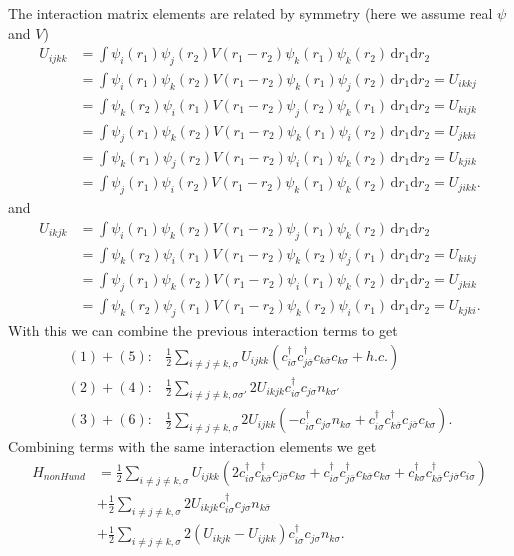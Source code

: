 \documentclass[12pt,a4paper]{scrartcl}
\numberwithin{equation}{section}
\begin{document}
The interaction matrix elements are related by symmetry (here we assume real $\psi$ and $V$)
\begin{align}
 U_{ijkk}
 &= \int \psi_i(r_1) \psi_j(r_2) V(r_1-r_2) \psi_k(r_1) \psi_k(r_2) \, \mathrm{d}r_1\mathrm{d}r_2 \\
 &= \int \psi_i(r_1) \psi_k(r_2) V(r_1-r_2) \psi_k(r_1) \psi_j(r_2) \, \mathrm{d}r_1\mathrm{d}r_2 = U_{ikkj} \\
 &= \int \psi_k(r_2) \psi_i(r_1) V(r_1-r_2) \psi_j(r_2) \psi_k(r_1) \, \mathrm{d}r_1\mathrm{d}r_2 = U_{kijk} \\
 &= \int \psi_j(r_1) \psi_k(r_2) V(r_1-r_2) \psi_k(r_1) \psi_i(r_2) \, \mathrm{d}r_1\mathrm{d}r_2 = U_{jkki} \\
 &= \int \psi_k(r_1) \psi_j(r_2) V(r_1-r_2) \psi_i(r_1) \psi_k(r_2) \, \mathrm{d}r_1\mathrm{d}r_2 = U_{kjik} \\
 &= \int \psi_j(r_1) \psi_i(r_2) V(r_1-r_2) \psi_k(r_1) \psi_k(r_2) \, \mathrm{d}r_1\mathrm{d}r_2 = U_{jikk} .
\end{align}
and 
\begin{align}
 U_{ikjk}
 &= \int \psi_i(r_1) \psi_k(r_2) V(r_1-r_2) \psi_j(r_1) \psi_k(r_2) \, \mathrm{d}r_1\mathrm{d}r_2 \\
 &= \int \psi_k(r_2) \psi_i(r_1) V(r_1-r_2) \psi_k(r_2) \psi_j(r_1) \, \mathrm{d}r_1\mathrm{d}r_2 = U_{kikj} \\
 &= \int \psi_j(r_1) \psi_k(r_2) V(r_1-r_2) \psi_i(r_1) \psi_k(r_2) \, \mathrm{d}r_1\mathrm{d}r_2 = U_{jkik} \\
 &= \int \psi_k(r_2) \psi_j(r_1) V(r_1-r_2) \psi_k(r_2) \psi_i(r_1) \, \mathrm{d}r_1\mathrm{d}r_2 = U_{kjki} .
\end{align}
With this we can combine the previous interaction terms to get
\begin{align}
 (1)+(5):& \frac{1}{2}\sum_{i\neq j\neq k,\sigma} U_{ijkk} ( c^{\dagger}_{i\sigma} c^{\dagger}_{j\bar{\sigma}} c_{k\bar{\sigma}} c_{k\sigma} + h.c. ) \\
%
 (2)+(4):&  \frac{1}{2}\sum_{i\neq j\neq k,\sigma\sigma'} 2 U_{ikjk} c^{\dagger}_{i\sigma} c_{j\sigma}  n_{k\sigma'} \\
%
 (3)+(6):& \frac{1}{2}\sum_{i\neq j\neq k,\sigma} 2 U_{ijkk} ( - c^{\dagger}_{i\sigma} c_{j\sigma} n_{k\sigma}
                            +c^{\dagger}_{i\sigma} c^{\dagger}_{k\bar{\sigma}} c_{j\bar{\sigma}} c_{k\sigma} ) .
\end{align}
Combining terms with the same interaction elements we get 
\begin{align}
 H_{nonHund} 
 &= \frac{1}{2}\sum_{i\neq j\neq k,\sigma} U_{ijkk} ( 2c^{\dagger}_{i\sigma} c^{\dagger}_{k\bar{\sigma}} c_{j\bar{\sigma}} c_{k\sigma}
                               + c^{\dagger}_{i\sigma} c^{\dagger}_{j\bar{\sigma}} c_{k\bar{\sigma}} c_{k\sigma} 
                               + c^{\dagger}_{k\sigma} c^{\dagger}_{k\bar{\sigma}} c_{j\bar{\sigma}} c_{i\sigma} ) \\
%
&+  \frac{1}{2}\sum_{i\neq j\neq k,\sigma} 2 U_{ikjk} c^{\dagger}_{i\sigma} c_{j\sigma}  n_{k\bar{\sigma}} \\
&+  \frac{1}{2}\sum_{i\neq j\neq k,\sigma} 2 (U_{ikjk} - U_{ijkk}) c^{\dagger}_{i\sigma} c_{j\sigma}  n_{k\sigma} .
\end{align}
\end{document}
